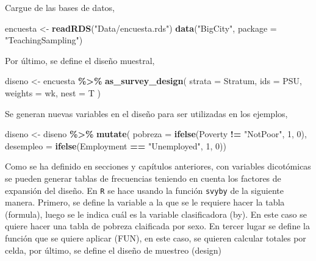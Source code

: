 \documentclass[
  spanish,
  12pt,
]{book}
\newenvironment{Shaded}{\begin{snugshade}}{\end{snugshade}}
\newcommand{\AttributeTok}[1]{\textcolor[rgb]{0.13,0.29,0.53}{#1}}
\newcommand{\DecValTok}[1]{\textcolor[rgb]{0.00,0.00,0.81}{#1}}
\newcommand{\FunctionTok}[1]{\textcolor[rgb]{0.13,0.29,0.53}{\textbf{#1}}}
\newcommand{\NormalTok}[1]{#1}
\newcommand{\OtherTok}[1]{\textcolor[rgb]{0.56,0.35,0.01}{#1}}
\newcommand{\SpecialCharTok}[1]{\textcolor[rgb]{0.81,0.36,0.00}{\textbf{#1}}}
\newcommand{\StringTok}[1]{\textcolor[rgb]{0.31,0.60,0.02}{#1}}
\begin{document}
Cargue de las bases de datos,

\begin{Shaded}
\begin{Highlighting}[]
\NormalTok{encuesta }\OtherTok{\textless{}{-}} \FunctionTok{readRDS}\NormalTok{(}\StringTok{"Data/encuesta.rds"}\NormalTok{)}
\FunctionTok{data}\NormalTok{(}\StringTok{"BigCity"}\NormalTok{, }\AttributeTok{package =} \StringTok{"TeachingSampling"}\NormalTok{)}
\end{Highlighting}
\end{Shaded}

Por último, se define el diseño muestral,

\begin{Shaded}
\begin{Highlighting}[]
\NormalTok{diseno }\OtherTok{\textless{}{-}}\NormalTok{ encuesta }\SpecialCharTok{\%\textgreater{}\%}
  \FunctionTok{as\_survey\_design}\NormalTok{(}
    \AttributeTok{strata =}\NormalTok{ Stratum,}
    \AttributeTok{ids =}\NormalTok{ PSU,}
    \AttributeTok{weights =}\NormalTok{ wk,}
    \AttributeTok{nest =}\NormalTok{ T}
\NormalTok{  )}
\end{Highlighting}
\end{Shaded}

Se generan nuevas variables en el diseño para ser utilizadas en los ejemplos,

\begin{Shaded}
\begin{Highlighting}[]
\NormalTok{diseno }\OtherTok{\textless{}{-}}\NormalTok{ diseno }\SpecialCharTok{\%\textgreater{}\%} \FunctionTok{mutate}\NormalTok{(}
  \AttributeTok{pobreza =} \FunctionTok{ifelse}\NormalTok{(Poverty }\SpecialCharTok{!=} \StringTok{"NotPoor"}\NormalTok{, }\DecValTok{1}\NormalTok{, }\DecValTok{0}\NormalTok{),}
  \AttributeTok{desempleo =} \FunctionTok{ifelse}\NormalTok{(Employment }\SpecialCharTok{==} \StringTok{"Unemployed"}\NormalTok{, }\DecValTok{1}\NormalTok{, }\DecValTok{0}\NormalTok{))}
\end{Highlighting}
\end{Shaded}

Como se ha definido en secciones y capítulos anteriores, con variables dicotómicas se pueden generar tablas de frecuencias teniendo en cuenta los factores de expansión del diseño. En \texttt{R} se hace usando la función \texttt{svyby} de la siguiente manera. Primero, se define la variable a la que se le requiere hacer la tabla (formula), luego se le indica cuál es la variable clasificadora (by). En este caso se quiere hacer una tabla de pobreza claificada por sexo. En tercer lugar se define la función que se quiere aplicar (FUN), en este caso, se quieren calcular totales por celda, por último, se define el diseño de muestreo (design)
\end{document}

